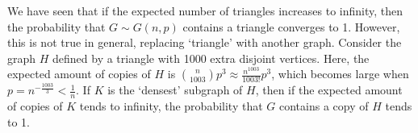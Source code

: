 \begin{remark}
	We have seen that if the expected number of triangles increases to infinity, then the probability that \( G \sim G(n,p) \) contains a triangle converges to 1.
	However, this is not true in general, replacing `triangle' with another graph.
	Consider the graph \( H \) defined by a triangle with 1000 extra disjoint vertices.
	Here, the expected amount of copies of \( H \) is \( \binom{n}{1003} p^3 \approx \frac{n^{1003}}{1003!} p^3 \), which becomes large when \( p = n^{-\frac{1003}{3}} < \frac{1}{n} \).
	If \( K \) is the `densest' subgraph of \( H \), then if the expected amount of copies of \( K \) tends to infinity, the probability that \( G \) contains a copy of \( H \) tends to 1.
\end{remark}
